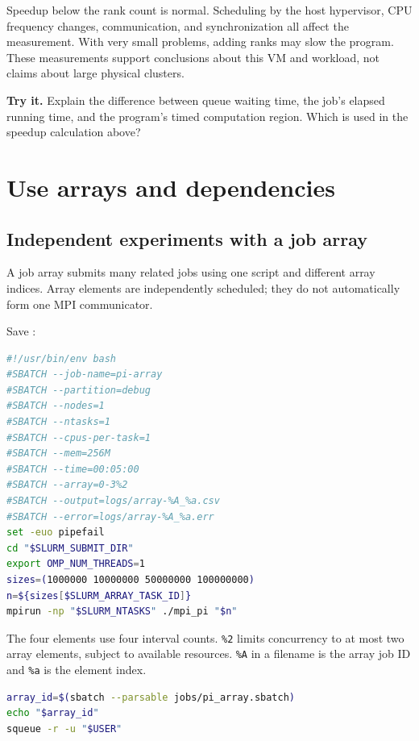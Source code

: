 \documentclass[11pt,a4paper]{article}
\newcommand{\task}[1]{\par\textbf{Try it.} #1\par}
\newcommand{\cmd}[1]{\texttt{\detokenize{#1}}}
\begin{document}
Speedup below the rank count is normal. Scheduling by the host hypervisor,
CPU frequency changes, communication, and synchronization all affect the
measurement. With very small problems, adding ranks may slow the program.
These measurements support conclusions about this VM and workload, not
claims about large physical clusters.

\task{Explain the difference between queue waiting time, the job's elapsed
running time, and the program's timed computation region. Which is used in
the speedup calculation above?}

\section{Use arrays and dependencies}
\subsection{Independent experiments with a job array}
A job array submits many related jobs using one script and different array
indices. Array elements are independently scheduled; they do not
automatically form one MPI communicator.\cite{slurm-array}

Save \cmd{jobs/pi_array.sbatch}:
\par\nobreak
\begin{minipage}{\linewidth}
\begin{lstlisting}[language=bash]
#!/usr/bin/env bash
#SBATCH --job-name=pi-array
#SBATCH --partition=debug
#SBATCH --nodes=1
#SBATCH --ntasks=1
#SBATCH --cpus-per-task=1
#SBATCH --mem=256M
#SBATCH --time=00:05:00
#SBATCH --array=0-3%2
#SBATCH --output=logs/array-%A_%a.csv
#SBATCH --error=logs/array-%A_%a.err
set -euo pipefail
cd "$SLURM_SUBMIT_DIR"
export OMP_NUM_THREADS=1
sizes=(1000000 10000000 50000000 100000000)
n=${sizes[$SLURM_ARRAY_TASK_ID]}
mpirun -np "$SLURM_NTASKS" ./mpi_pi "$n"
\end{lstlisting}
\end{minipage}\par

The four elements use four interval counts. \texttt{\%2} limits concurrency to
at most two array elements, subject to available resources. \texttt{\%A} in a
filename is the array job ID and \texttt{\%a} is the element index.

\par\nobreak
\begin{minipage}{\linewidth}
\begin{lstlisting}[language=bash]
array_id=$(sbatch --parsable jobs/pi_array.sbatch)
echo "$array_id"
squeue -r -u "$USER"
\end{lstlisting}
\end{minipage}\par
\end{document}
